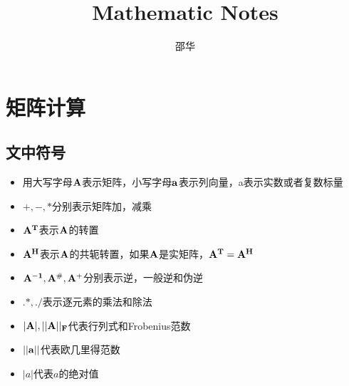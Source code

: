 \documentclass[fontset=none,oneside]{book}
\begin{document}
\title{Mathematic Notes}
\author{邵华}
\maketitle
\tableofcontents
\chapter{矩阵计算}
\section{文中符号}
\begin{itemize}
\item 用大写字母$\bf A$表示矩阵，小写字母$\bf a$表示列向量，a表示实数或者复数标量
\item $+,-,*$分别表示矩阵加，减乘
\item $\bf A^T$表示$\bf A$的转置
\item $\bf A^H$表示$\bf A$的共轭转置，如果$\bf A$是实矩阵，$\bf A^T=\bf A^H$
\item $\bf A^{-1},A^{\#},A^{+}$分别表示逆，一般逆和伪逆
\item $.*,./$表示逐元素的乘法和除法
\item $|\bf A|,||\bf A||_F$代表行列式和Frobenius范数
\item $||\bf a||$代表欧几里得范数
\item $|a|$代表$a$的绝对值
\end{itemize}
\end{document}
